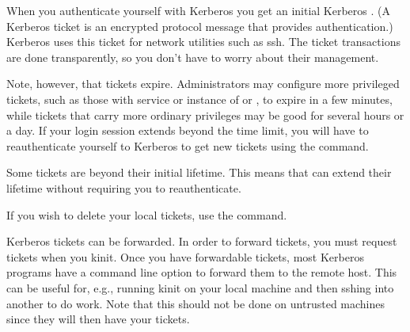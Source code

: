 \documentclass[letterpaper,10pt,english]{sphinxmanual}
\begin{document}
\sphinxAtStartPar
When you authenticate yourself with Kerberos you get an initial
Kerberos .  (A Kerberos ticket is an encrypted protocol
message that provides authentication.)  Kerberos uses this ticket for
network utilities such as ssh.  The ticket transactions are done
transparently, so you don’t have to worry about their management.

\sphinxAtStartPar
Note, however, that tickets expire.  Administrators may configure more
privileged tickets, such as those with service or instance of 
or , to expire in a few minutes, while tickets that carry
more ordinary privileges may be good for several hours or a day.  If
your login session extends beyond the time limit, you will have to
re\sphinxhyphen{}authenticate yourself to Kerberos to get new tickets using the
{\hyperref[\detokenize{user/user_commands/kinit:kinit-1}]{}} command.

\sphinxAtStartPar
Some tickets are  beyond their initial lifetime.  This
means that  can extend their lifetime without requiring
you to re\sphinxhyphen{}authenticate.

\sphinxAtStartPar
If you wish to delete your local tickets, use the {\hyperref[\detokenize{user/user_commands/kdestroy:kdestroy-1}]{}}
command.

\sphinxAtStartPar
Kerberos tickets can be forwarded.  In order to forward tickets, you
must request  tickets when you kinit.  Once you have
forwardable tickets, most Kerberos programs have a command line option
to forward them to the remote host.  This can be useful for, e.g.,
running kinit on your local machine and then sshing into another to do
work.  Note that this should not be done on untrusted machines since
they will then have your tickets.
\end{document}
